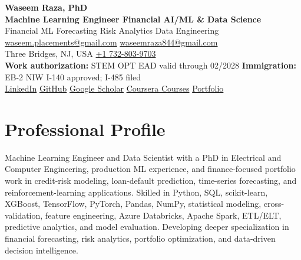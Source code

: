 \documentclass[9pt,letterpaper]{extarticle}
\begin{document}
\begin{center}
{\LARGE\bfseries Waseem Raza, PhD}{\normalsize\mdseries }\\[2pt]
{\large\bfseries Machine Learning Engineer \textbar{} Financial AI/ML \& Data Science}\\[1pt]
{\small Financial ML \textbar{} Forecasting \textbar{} Risk Analytics \textbar{} Data Engineering}\\[3pt]
{\footnotesize {}\enspace \href{mailto:waseem.placements@gmail.com}{waseem.placements@gmail.com} \textbar{} \href{mailto:waseemraza844@gmail.com}{waseemraza844@gmail.com}\\[1pt]Three Bridges, NJ, USA \quad {}\enspace \href{tel:+17328039703}{+1 732-803-9703}\\[1pt]{\scriptsize \textbf{Work authorization:} STEM OPT EAD valid through 02/2028 \textbar{} \textbf{Immigration:} EB-2 NIW I-140 approved; I-485 filed}\\[1pt]\href{https://www.linkedin.com/in/waseem-raza-phd-9a737858/}{LinkedIn} \textbar{} \href{https://github.com/WaseemRaza844}{GitHub} \textbar{} \href{https://scholar.google.com/citations?user=d58Drr0AAAAJ\&hl=en}{Google Scholar} \textbar{} \href{https://waseemraza844.github.io/portfolio/learning.html}{Coursera Courses} \textbar{} \href{https://waseemraza844.github.io/portfolio/}{Portfolio}}
\end{center}
\vspace{-5pt}
\section{Professional Profile}
Machine Learning Engineer and Data Scientist with a PhD in Electrical and Computer Engineering, production ML experience, and finance-focused portfolio work in credit-risk modeling, loan-default prediction, time-series forecasting, and reinforcement-learning applications. Skilled in Python, SQL, scikit-learn, XGBoost, TensorFlow, PyTorch, Pandas, NumPy, statistical modeling, cross-validation, feature engineering, Azure Databricks, Apache Spark, ETL/ELT, predictive analytics, and model evaluation. Developing deeper specialization in financial forecasting, risk analytics, portfolio optimization, and data-driven decision intelligence.
\end{document}
